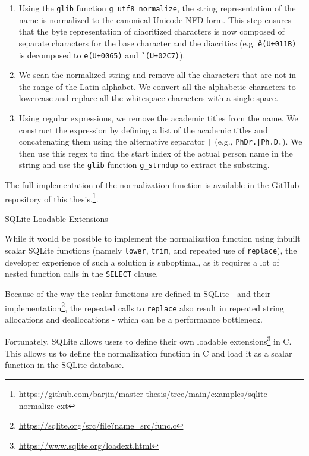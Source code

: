 \begin{enumerate}
    \item Using the \texttt{glib} function \texttt{g\_utf8\_normalize}, the string representation of the name is normalized to the canonical Unicode \ac{NFD} form.
    This step ensures that the byte representation of diacritized characters is now composed of separate characters for the base character and the diacritics (e.g. \texttt{ě}\texttt{(U+011B)} is decomposed to \texttt{e}\texttt{(U+0065)} and \texttt{ˇ}\texttt{(U+02C7)}).
    \item We scan the normalized string and remove all the characters that are not in the range of the Latin alphabet. We convert all the 
    alphabetic characters to lowercase and replace all the whitespace characters with a single space.
    \item Using regular expressions, we remove the academic titles from the name. 
    We construct the expression by defining a list of the academic titles and concatenating them using the alternative separator \texttt{|} (e.g., \texttt{PhDr.|Ph.D.}).
    We then use this regex to find the start index of the actual person name in the string
    and use the \texttt{glib} function \texttt{g\_strndup} to extract the substring.
\end{enumerate}

The full implementation of the normalization function is available in the GitHub repository of this thesis.\footnote{\url{https://github.com/barjin/master-thesis/tree/main/examples/sqlite-normalize-ext}}.

\begin{mybox}
    {SQLite Loadable Extensions}

    While it would be possible to implement the normalization function using inbuilt scalar SQLite functions (namely \texttt{lower}, \texttt{trim},
    and repeated use of \texttt{replace}), the developer experience of such a solution is suboptimal, as it requires a lot of nested function calls
    in the \texttt{SELECT} clause.

    Because of the way the scalar functions are defined in SQLite - and their implementation\footnote{\url{https://sqlite.org/src/file?name=src/func.c}}, 
    the repeated calls to \texttt{replace} also result in repeated string allocations and deallocations - which can be a performance bottleneck.

    Fortunately, SQLite allows users to define their own loadable extensions\footnote{\url{https://www.sqlite.org/loadext.html}} in C.
    This allows us to define the normalization function in C and load it as a scalar function in the SQLite database.
\end{mybox}

